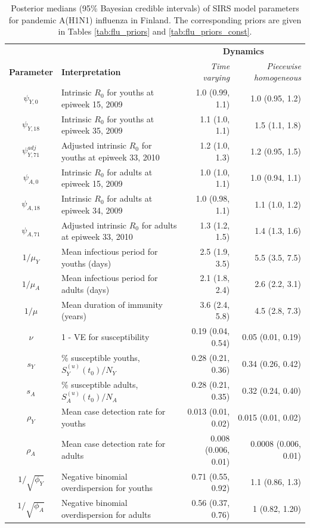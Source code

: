 \begin{table}
	\caption[Posterior estimates of SIRS model parameters for pandemic A(H1N1) influenza in Finland.]{Posterior medians (95\% Bayesian credible intervals) of SIRS model parameters for pandemic A(H1N1) influenza in Finland. The corresponding priors are given in Tables \ref{tab:flu_priors} and \ref{tab:flu_priors_const}.} 
	\label{tab:flu_param_ests}
	\centering\footnotesize
	\begin{tabular}{clrr}
		\hline
		&&\multicolumn{2}{c}{\textbf{Dynamics}}\\
		\cmidrule{3-4}\textbf{Parameter} & \textbf{Interpretation} & \textit{Time varying} & \textit{Piecewise homogeneous}\\
		\hline
		$ \psi_{Y,0} $ & Intrinsic $ R_0 $ for youths at epiweek 15, 2009  & 1.0 (0.99, 1.1) & 1.0 (0.95, 1.2)\\
		$ \psi_{Y,18} $ & Intrinsic $ R_0 $ for youths at epiweek 35, 2009 & 1.1 (1.0, 1.1) & 1.5 (1.1, 1.8)\\
		$ \psi_{Y,71}^{adj} $ & Adjusted intrinsic $ R_0 $ for youths at epiweek 33, 2010 & 1.2 (1.0, 1.3) & 1.2 (0.95, 1.5)\\
		$ \psi_{A,0} $ & Intrinsic $ R_0 $ for adults at epiweek 15, 2009  & 1.0 (1.0, 1.1) & 1.0 (0.94, 1.1)\\
		$ \psi_{A,18} $ & Intrinsic $ R_0 $ for adults at epiweek 34, 2009 & 1.0 (0.98, 1.1) & 1.1 (1.0, 1.2)\\
		$ \psi_{A,71} $ & Adjusted intrinsic $ R_0 $ for adults at epiweek 33, 2010 & 1.3 (1.2, 1.5) & 1.4 (1.3, 1.6)\\
		$ 1/\mu_{Y} $ & Mean infectious period for youths (days) & 2.5 (1.9, 3.5) & 5.5 (3.5, 7.5)\\
		$ 1/\mu_A $ & Mean infectious period for adults (days) & 2.1 (1.8, 2.4) & 2.6 (2.2, 3.1)\\
		$ 1/\mu $ & Mean duration of immunity (years) & 3.6 (2.4, 5.8) & 4.5 (2.8, 7.3)\\
		$ \nu $ & 1 - VE for susceptibility & 0.19 (0.04, 0.54) & 0.05 (0.01, 0.19)\\
		$ s_Y $ & \% susceptible youths, $ S^{(u)}_Y(t_0) / N_Y $ & 0.28 (0.21, 0.36) & 0.34 (0.26, 0.42) \\
		$ s_A $ & \% susceptible adults, $ S_A^{(u)}(t_0) / N_A $ & 0.28 (0.21, 0.35) & 0.32 (0.24, 0.40) \\
		$ \rho_Y $ & Mean case detection rate for youths & 0.013 (0.01, 0.02) & 0.015 (0.01, 0.02)\\
		$ \rho_A $ & Mean case detection rate for adults & 0.008 (0.006, 0.01) & 0.0008 (0.006, 0.01)\\		
		$ 1/\sqrt{\phi_Y} $ & Negative binomial overdispersion for youths & 0.71 (0.55, 0.92) & 1.1 (0.86, 1.3)\\
		$ 1/\sqrt{\phi_A} $ & Negative binomial overdispersion for adults & 0.56 (0.37, 0.76) & 1 (0.82, 1.20)\\
		\hline
	\end{tabular}
\end{table}

